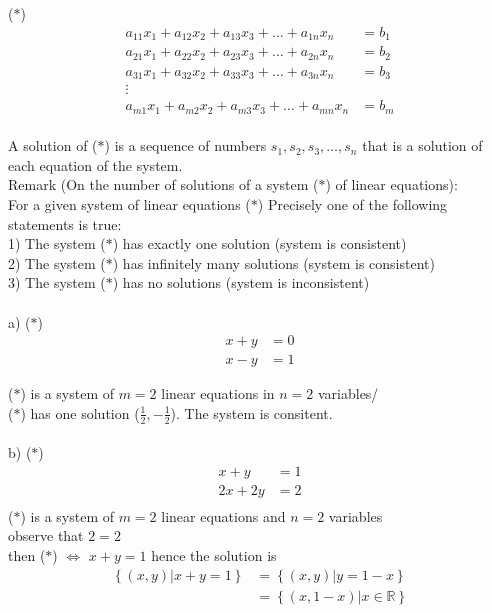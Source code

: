 \documentclass{jhwhw}
\begin{document}
(\(\ast\)) \begin{align*} 
a_{11} x_1 + a_{12} x_2 + a_{13} x_3 + \ldots + a_{1n} x_n &= b_1\\
a_{21} x_1 + a_{22} x_2 + a_{23} x_3 + \ldots + a_{2n} x_n &= b_2\\
a_{31} x_1 + a_{32} x_2 + a_{33} x_3 + \ldots + a_{3n} x_n &= b_3\\
\vdots\\
a_{m1} x_1 + a_{m2} x_2 + a_{m3} x_3 + \ldots + a_{mn} x_n &= b_m
\end{align*}
\\

A solution of (\(\ast\)) is a sequence of numbers \(s_1, s_2, s_3, \ldots, s_n\) that is a solution of each equation of the system.
\\

Remark (On the number of solutions of a system (\(\ast\)) of linear equations):
\\

For a given system of linear equations (\(\ast\)) Precisely one of the following statements is true:
\\

1) The system (\(\ast\)) has exactly one solution (system is consistent) \\
2) The system (\(\ast\)) has infinitely many solutions (system is consistent) \\
3) The system (\(\ast\)) has no solutions (system is inconsistent) \\
\\

a) (\(\ast\)) \begin{align*} 
    x+y &= 0 \\
    x-y &=1
\end{align*}

(\(\ast\)) is a system of \(m =2 \) linear equations in \(n=2\) variables/ \\
(\(\ast\)) has one solution (\(\frac{1}{2}, -\frac{1}{2}\)). The system is consitent.
\\ \\

b) (\(\ast\)) \begin{align*} 
x+y&=1 \\
2x+2y&=2 \\
\end{align*}
(\(\ast\)) is a system of \(m=2\) linear equations and \(n=2\) variables \\
observe that \(2=2\) \\
then (\(\ast\)) \(\Leftrightarrow\) \(x+y=1\) hence the solution is \\
\begin{align*} 
\left\{(x,y) | x+y=1 \right\} &= \left\{ (x,y) | y=1-x \right\} \\
&= \left\{ (x,1-x) | x \in \mathbb{R} \right\}
\end{align*}
\\ \\
\end{document}
